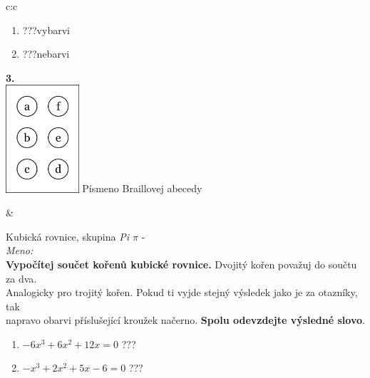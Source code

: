 \documentclass[10pt]{report}
\begin{document}
\begin{tabular}{c:c}
\begin{minipage}[c][99mm][t]{0.49\linewidth}
\begin{center}
\begin{minipage}{0.77\linewidth}
\begin{center}
\begin{varwidth}{\textwidth}
\begin{enumerate}
\item \quad \dotfill\; ???\;\dotfill \quad vybarvi
\item \quad \dotfill\; ???\;\dotfill \quad nebarvi
\end{enumerate}
\end{varwidth}
\end{center}
\end{minipage}
\begin{minipage}{0.20\linewidth}
\begin{center}
{\Huge\bfseries 3.} \\[2mm]
\includegraphics[height=40mm]{../images/braille.png}
{\small Písmeno Braillovej abecedy}
\end{center}
\end{minipage}
\end{center}
\end{minipage}
&
\begin{minipage}[c][99mm][t]{0.49\linewidth}
\begin{center}
\vspace{7mm}
{\huge Kubická rovnice, skupina \textit{Pi $\pi$} -}\\[4.5mm]
\textit{Meno:}\phantom{xxxxxxxxxxxxxxxxxxxxxxxxxxxxxxxxxxxxxxxxxxxxxxxxxxxxxxxxxxxxxxxxx}\\[3.5mm]
\textbf{Vypočítej součet kořenů kubické rovnice.} Dvojitý kořen považuj do součtu za dva.\\Analogicky pro trojitý kořen. Pokud ti vyjde stejný výsledek jako je za otazníky, tak\\napravo obarvi příslušející kroužek načerno. \textbf{Spolu odevzdejte výsledné slovo}.\\[3mm]
\begin{minipage}{0.77\linewidth}
\begin{center}
\begin{varwidth}{\textwidth}
\begin{enumerate}
\large
\item $-6x^3+6x^2+12x=0$\quad \dotfill\; ???\;\dotfill {}
\item $-x^3+2x^2+5x-6=0$\quad \dotfill\; ???\;\dotfill {}

\end{enumerate}
\end{varwidth}
\end{center}
\end{minipage}
\end{center}
\end{minipage}
\end{tabular}
\end{document}

